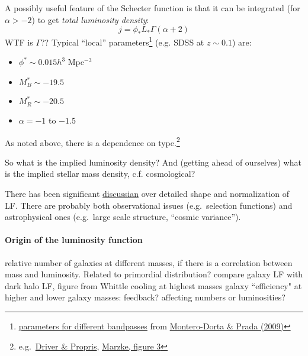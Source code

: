 \documentclass{article}
\newcommand{\mynotes}[1]{\textcolor{cadmiumgreen}{#1}}
\begin{document}
A possibly useful feature of the Schecter function is that it can be
integrated (for $\alpha > -2$) to get \textit{total luminosity density}:
\[
    j = \phi_{*}L_{*}\Gamma\left(\alpha + 2\right)
    \]
\mynotes{WTF is $\Gamma$??}
Typical ``local'' parameters\footnote{
    \href{http://astronomy.nmsu.edu/holtz/a555/resources/monterotab2.gif}
    {parameters for different bandpasses} from
    \href{http://adsabs.harvard.edu/abs/2009MNRAS.399.1106M}
    {Montero-Dorta \& Prada (2009)}
}
(e.g. SDSS at $z\sim0.1$) are:
\begin{itemize}
    \item $\phi^{*}\sim0.015h^{3}$ Mpc$^{-3}$
    \item $M_{B}^{*}\sim-19.5$
    \item $M_{R}^{*}\sim-20.5$
    \item $\alpha=-1$ to $-1.5$
\end{itemize}
As noted above, there is a dependence on type.\footnote{
    e.g.\ \href{http://astronomy.nmsu.edu/holtz/a555/resources/lf_environment.gif}
    {Driver \& Propris},
    \href{http://astronomy.nmsu.edu/holtz/a555/html/diagrams/a616/marzke3.htm}
    {Marzke, figure 3}
}

So what is the implied luminosity density? And (getting ahead of ourselves)
what is the implied stellar mass density, c.f. cosmological?

There has been significant
\href{http://astronomy.nmsu.edu/holtz/a555/images/blantontab3.htm}
{discussian} over detailed shape and normalization of
LF\@.  There are probably both observational issues (e.g.\ selection functions)
and astrophysical ones (e.g.\ large scale structure, ``cosmic variance'').

\paragraph{Origin of the luminosity function}
relative number of galaxies at different masses, if there is a correlation
between mass and luminosity. Related to primordial distribution? compare galaxy
LF with dark halo LF, figure from Whittle cooling at highest masses galaxy
``efficiency" at higher and lower galaxy masses: feedback? affecting numbers or
luminosities?
\end{document}
